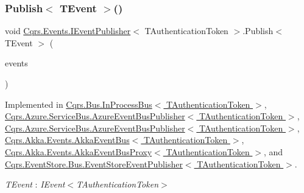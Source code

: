\subsubsection{\texorpdfstring{Publish$<$ T\+Event $>$()}{Publish< TEvent >()}\hspace{0.1cm}{\footnotesize\ttfamily [2/2]}}
{\footnotesize\ttfamily void \hyperlink{interfaceCqrs_1_1Events_1_1IEventPublisher}{Cqrs.\+Events.\+I\+Event\+Publisher}$<$ T\+Authentication\+Token $>$.Publish$<$ T\+Event $>$ (\begin{DoxyParamCaption}\item[{I\+Enumerable$<$ T\+Event $>$}]{events }\end{DoxyParamCaption})}



Implemented in \hyperlink{classCqrs_1_1Bus_1_1InProcessBus_ae154f274db2a028a6094677d83cc1c74}{Cqrs.\+Bus.\+In\+Process\+Bus$<$ T\+Authentication\+Token $>$}, \hyperlink{classCqrs_1_1Azure_1_1ServiceBus_1_1AzureEventBusPublisher_a8bb9cd1172e7dec117cde75eb6b0f056}{Cqrs.\+Azure.\+Service\+Bus.\+Azure\+Event\+Bus\+Publisher$<$ T\+Authentication\+Token $>$}, \hyperlink{classCqrs_1_1Azure_1_1ServiceBus_1_1AzureEventBusPublisher_a8bb9cd1172e7dec117cde75eb6b0f056}{Cqrs.\+Azure.\+Service\+Bus.\+Azure\+Event\+Bus\+Publisher$<$ T\+Authentication\+Token $>$}, \hyperlink{classCqrs_1_1Akka_1_1Events_1_1AkkaEventBus_ad5b996dd77efbf51a2b5a32f94417772}{Cqrs.\+Akka.\+Events.\+Akka\+Event\+Bus$<$ T\+Authentication\+Token $>$}, \hyperlink{classCqrs_1_1Akka_1_1Events_1_1AkkaEventBusProxy_af4c202eaab00ed2fb6160d5b114d935c}{Cqrs.\+Akka.\+Events.\+Akka\+Event\+Bus\+Proxy$<$ T\+Authentication\+Token $>$}, and \hyperlink{classCqrs_1_1EventStore_1_1Bus_1_1EventStoreEventPublisher_a85b4922ff01b088b01b39463681c6eb6}{Cqrs.\+Event\+Store.\+Bus.\+Event\+Store\+Event\+Publisher$<$ T\+Authentication\+Token $>$}.

\begin{Desc}
\item[Type Constraints]\begin{description}
\item[{\em T\+Event} : {\em I\+Event$<$T\+Authentication\+Token$>$}]\end{description}
\end{Desc}
